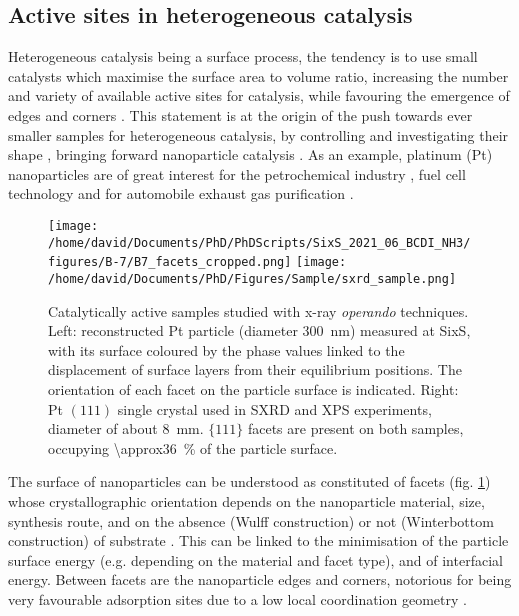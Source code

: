 \subsection{Active sites in heterogeneous catalysis}

Heterogeneous catalysis being a surface process, the tendency is to use small catalysts which maximise the surface area to volume ratio, increasing the number and variety of available active sites for catalysis, while favouring the emergence of edges and corners \parencite{Zambelli1996, Hendriksen2010, Vogt2022}.
This statement is at the origin of the push towards ever smaller samples for heterogeneous catalysis, by controlling and investigating their shape \parencite{Lee2006, Tian2007, Bratlie2007, Lee2009}, bringing forward nanoparticle catalysis \parencite{Che1989, Raimondi2005, Arico2005, Molenbroek2009, VanSanten2010, Schauermann2013}.
As an example, platinum (Pt) nanoparticles are of great interest for the petrochemical industry \parencite{Astruc2005, Astruc2020}, fuel cell technology and for automobile exhaust gas purification \parencite{Heck2001}.

\begin{figure}[!htb]
    \centering
    \texttt{[image: /home/david/Documents/PhD/PhDScripts/SixS\_2021\_06\_BCDI\_NH3/figures/B-7/B7\_facets\_cropped.png]}
    \texttt{[image: /home/david/Documents/PhD/Figures/Sample/sxrd\_sample.png]}
    \caption{
        Catalytically active samples studied with x-ray \textit{operando} techniques.
        Left: reconstructed Pt particle (diameter \qty{300}{\nm}) measured at SixS, with its surface coloured by the phase values linked to the displacement of surface layers from their equilibrium positions.
        The orientation of each facet on the particle surface is indicated.
        Right: Pt $(111)$ single crystal used in SXRD and XPS experiments, diameter of about \qty{8}{\mm}.
        $\{111\}$ facets are present on both samples, occupying \qty{\approx36}{\percent} of the particle surface.
    }
    \label{fig:Samples}
\end{figure}

The surface of nanoparticles can be understood as constituted of facets (fig. \ref{fig:Samples}) whose crystallographic orientation depends on the nanoparticle material, size, synthesis route, and on the absence (Wulff construction) or not (Winterbottom construction) of substrate \parencite{Wulff1901, Winterbottom1967, Boukouvala2021}.
This can be linked to the minimisation of the particle surface energy (e.g. depending on the material and facet type), and of interfacial energy.
Between facets are the nanoparticle edges and corners, notorious for being very favourable adsorption sites due to a low local coordination geometry \parencite{Huang2008, Jiang2009}.

